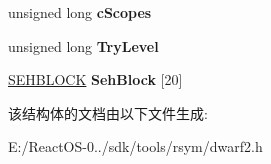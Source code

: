 \begin{DoxyCompactItemize}
\mbox{\label{struct___c_f_s_t_a_t_e_a2f9e409d957eb67e8bc10b470f887d56}} 
unsigned long {\bfseries c\+Scopes}
\item 
\mbox{\label{struct___c_f_s_t_a_t_e_a95403b7b1965a03657e8f5732c3247b5}} 
unsigned long {\bfseries Try\+Level}
\item 
\mbox{\label{struct___c_f_s_t_a_t_e_a7788676a28aea46b750ea2a4a5391e7c}} 
\hyperlink{struct___s_e_h_b_l_o_c_k}{S\+E\+H\+B\+L\+O\+CK} {\bfseries Seh\+Block} \mbox{[}20\mbox{]}
\end{DoxyCompactItemize}


该结构体的文档由以下文件生成\+:\begin{DoxyCompactItemize}
\item 
E\+:/\+React\+O\+S-\/0../sdk/tools/rsym/dwarf2.\+h\end{DoxyCompactItemize}
